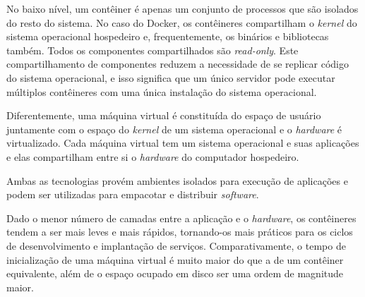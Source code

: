 \documentclass[twosideprint]{politex}
\begin{document}
	No baixo nível, um contêiner é apenas um conjunto de processos que são isolados do resto do sistema. No caso do Docker, os contêineres compartilham o \textit{kernel} do sistema operacional hospedeiro e, frequentemente, os binários e bibliotecas também. Todos os componentes compartilhados são \textit{read-only}. Este compartilhamento de componentes reduzem a necessidade de se replicar código do sistema operacional, e isso significa que um único servidor pode executar múltiplos contêineres com uma única instalação do sistema operacional.

	Diferentemente, uma máquina virtual é constituída do espaço de usuário juntamente com o espaço do \textit{kernel} de um sistema operacional e o \textit{hardware} é virtualizado. Cada máquina virtual tem um sistema operacional e suas aplicações e elas compartilham entre si o \textit{hardware} do computador hospedeiro.

	Ambas as tecnologias provém ambientes isolados para execução de aplicações e podem ser utilizadas para empacotar e distribuir \textit{software}.

	Dado o menor número de camadas entre a aplicação e o \textit{hardware},  os contêineres tendem a ser mais leves e mais rápidos, tornando-os mais práticos para os ciclos de desenvolvimento e implantação de serviços. Comparativamente, o tempo de inicialização de uma máquina virtual é muito maior do que a de um contêiner equivalente, além de o espaço ocupado em disco ser uma ordem de magnitude maior. \cite{whatsthediffvmvscontainers}
	
\end{document}
